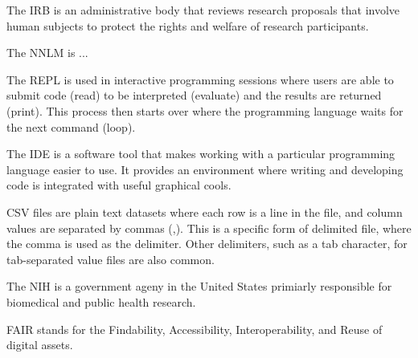 \documentclass[main.tex]{subfiles}
\begin{document}

  The IRB is an administrative body that reviews research proposals that involve human subjects to protect the rights and welfare of
  research participants.


  The NNLM is ... %


  The REPL is used in interactive programming sessions where users are able to
  submit code (read) to be interpreted (evaluate) and the results are returned (print).
  This process then starts over where the programming language waits for the next command (loop).


  The IDE is a software tool that makes working with a particular programming language easier to use.
  It provides an environment where writing and developing code is integrated with useful
  graphical cools.


  CSV files are plain text datasets where each row is a line in the file,
  and column values are separated by commas (,).
  This is a specific form of delimited file, where the comma is used as the delimiter.
  Other delimiters, such as a tab character, for tab-separated value files are also common.


  The NIH is a government ageny in the United States primiarly responsible for biomedical and public health research.


  FAIR stands for the Findability, Accessibility, Interoperability, and Reuse of digital assets.

\end{document}
